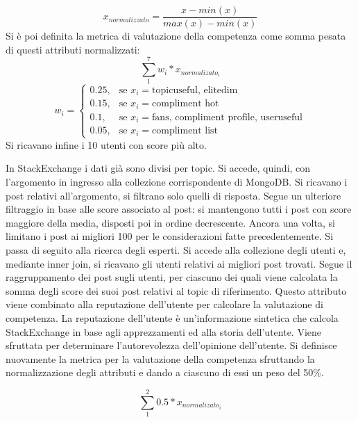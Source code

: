 \begin{equation*}
x_{normalizzato} = \frac{x - min(x)}{max(x)-min(x)}
\end{equation*}
Si è poi definita la metrica di valutazione della competenza come somma pesata di questi attributi normalizzati:
\begin{equation*}
\sum_{1}^{7}{w_i*x_{{normalizato}_i}}
\end{equation*}
\begin{equation*}
w_i=\begin{cases} 0.25, & \mbox{se } x_i= \mbox{topicuseful, elitedim}\\ 0.15, & \mbox{se } x_i= \mbox{compliment hot}\\ 0.1, & \mbox{se } x_i= \mbox{fans, compliment profile, useruseful} \\ 0.05, & \mbox{se } x_i= \mbox{compliment list}
\end{cases}
\end{equation*}
Si ricavano infine i 10 utenti con score più alto.\par
In StackExchange i dati già sono divisi per topic. Si accede, quindi, con l'argomento in ingresso alla collezione corrispondente di MongoDB. Si ricavano i post relativi all'argomento, si filtrano solo quelli di risposta. Segue un ulteriore filtraggio in base alle score associato al post: si mantengono tutti i post con score maggiore della media, disposti poi in ordine decrescente. Ancora una volta, si limitano i post ai migliori 100 per le considerazioni fatte precedentemente. Si passa di seguito alla ricerca degli esperti. Si accede alla collezione degli utenti e, mediante inner join, si ricavano gli utenti relativi ai migliori post trovati. Segue il raggruppamento dei post sugli utenti, per ciascuno dei quali viene calcolata la somma degli score dei suoi post relativi al topic di riferimento. Questo attributo viene combinato alla reputazione dell'utente per calcolare la valutazione di competenza. La reputazione dell'utente è un'informazione sintetica che calcola StackExchange in base agli apprezzamenti ed alla storia dell'utente. Viene sfruttata per determinare l'autorevolezza dell'opinione dell'utente. Si definisce nuovamente la metrica per la valutazione della competenza sfruttando la normalizzazione degli attributi e dando a ciascuno di essi un peso del 50\%.

\begin{equation*}
\sum_{1}^{2}{0.5*x_{{normalizato}_i}}
\end{equation*}

